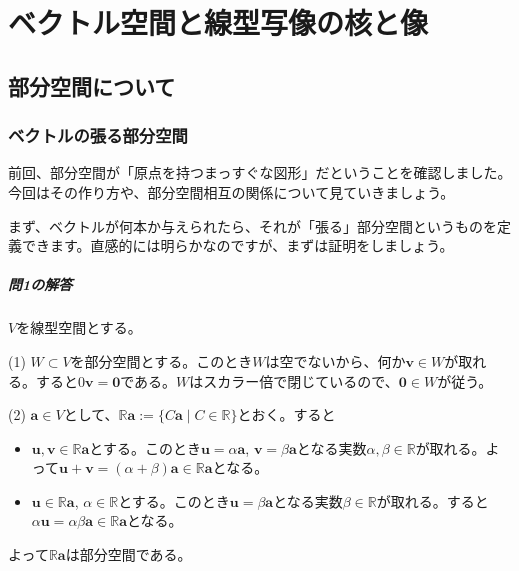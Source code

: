 \chapter{ベクトル空間と線型写像の核と像}


\section{部分空間について}

\subsection{ベクトルの張る部分空間}

前回、部分空間が「原点を持つまっすぐな図形」だということを確認しました。今回はその作り方や、部分空間相互の関係について見ていきましょう。

まず、ベクトルが何本か与えられたら、それが「張る」部分空間というものを定義できます。直感的には明らかなのですが、まずは証明をしましょう。


\paragraph{問1の解答} $V$を線型空間とする。

\noindent (1) $W\subset V$を部分空間とする。このとき$W$は空でないから、何か$\bm{v} \in W$が取れる。すると$0\bm{v} = \bm{0}$である。$W$はスカラー倍で閉じているので、$\bm{0}\in W$が従う。

\noindent (2) $\bm{a}\in V$として、$\mathbb{R}\bm{a} := \{C\bm{a} \mid C\in\mathbb{R}\}$とおく。すると
\begin{itemize}
\item $\bm{u}, \bm{v} \in \mathbb{R}\bm{a}$とする。このとき$\bm{u} = \alpha\bm{a}$, $\bm{v} = \beta\bm{a}$となる実数$\alpha, \beta\in\mathbb{R}$が取れる。よって$\bm{u} + \bm{v} = (\alpha + \beta)\bm{a}\in\mathbb{R}\bm{a}$となる。
\item $\bm{u}\in \mathbb{R}\bm{a}$, $\alpha\in\mathbb{R}$とする。このとき$\bm{u} = \beta\bm{a}$となる実数$\beta\in\mathbb{R}$が取れる。すると$\alpha\bm{u} = \alpha\beta\bm{a}\in \mathbb{R}\bm{a}$となる。
\end{itemize}
よって$\mathbb{R}\bm{a}$は部分空間である。

